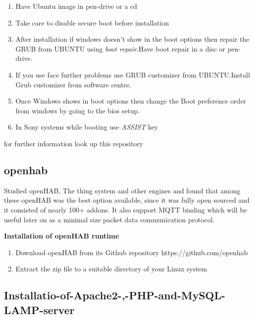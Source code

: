 \documentclass[16pt]{article}
\begin{document}
\hfill
  \begin{enumerate}
  \item
    Have Ubuntu image in pen-drive or a cd
  \item
    Take care to disable secure boot before installation
  \item
    After installation if windows doesn't show in the boot options then
    repair the GRUB from UBUNTU using \emph{boot repair}.Have boot repair in a disc or pen-drive.
  \item
    If you use face further problems use GRUB customizer from UBUNTU.Install Grub customizer from software centre.
  \item
    Once Windows shows in boot options then change the Boot preference
    order from windows by going to the bios setup.
  \item
    In Sony systems while booting use \emph{ASSIST} key
  \end{enumerate}
  
for further information look up this repository 
  
\hfill

\subsection{openhab}


Studied openHAB, The thing system and other engines and found that among these openHAB was the best option available, since it was fully open sourced and it
consisted of nearly 100+ addons. It also support MQTT binding which will be useful later on as a minimal size packet data communication protocol.

\hfill

\textbf{Installation of openHAB runtime}

\begin{enumerate}

  \item Download openHAB from its Github repository https://github.com/openhab
  \item Extract the zip file to a suitable directory of your Linux system

  \end{enumerate}
  
\hfill

\subsection{Installatio-of-Apache2-,-PHP-and-MySQL-LAMP-server}
\end{document}
